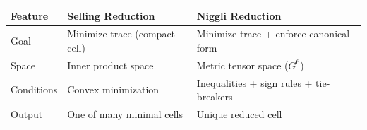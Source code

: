 \documentclass[preprint]{iucr}              %
\begin{document}
\begin{center}
	\begin{tabular}{|l|l|l|}
		\hline
		\textbf{Feature} & \textbf{Selling Reduction} & \textbf{Niggli Reduction} \\
		\hline
		Goal & Minimize trace (compact cell) & Minimize trace + enforce canonical form \\
		Space & Inner product space & Metric tensor space ($G^6$) \\
		Conditions & Convex minimization & Inequalities + sign rules + tie-breakers \\
		Output & One of many minimal cells & Unique reduced cell \\
		\hline
	\end{tabular}
\end{center}
\end{document}

